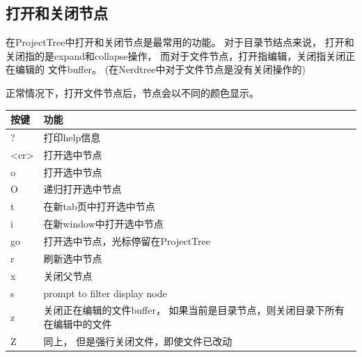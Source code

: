 \documentclass[oneside,openany]{book}
\begin{document}
  \subsection{打开和关闭节点}
  在ProjectTree中打开和关闭节点是最常用的功能。 对于目录节结点来说，
打开和关闭指的是expand和collapse操作， 而对于文件节点，打开指编辑，关闭指关闭正在编辑的
文件buffer。 (在Nerdtree中对于文件节点是没有关闭操作的)
  
  正常情况下，打开文件节点后，节点会以不同的颜色显示。
  \begin{table}[H]
  \centering
      \begin{tabular}{p{40pt}p{220pt}}
        \toprule
        按键& 功能\\
        \midrule
          ?     &打印help信息\\
          <cr>  &打开选中节点\\
          o     &打开选中节点\\
          O     &递归打开选中节点\\
          t     &在新tab页中打开选中节点\\
          i     &在新window中打开选中节点\\
          go    &打开选中节点，光标停留在ProjectTree\\
          r     &刷新选中节点\\
          x     &关闭父节点\\
          s     &prompt to filter display node\\
          z     &关闭正在编辑的文件buffer， 如果当前是目录节点，则关闭目录下所有在编辑中的文件\\
          Z     &同上， 但是强行关闭文件，即使文件已改动\\
      \bottomrule
      \end{tabular}
  \end{table}
\end{document}
